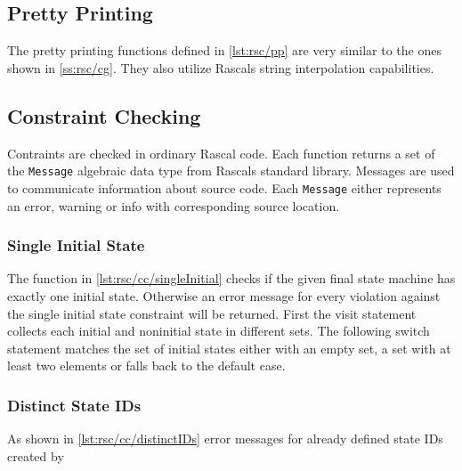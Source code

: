\subsection{Pretty Printing}

The pretty printing functions defined in \autoref{lst:rsc/pp} are very similar to the ones shown in \autoref{ss:rsc/cg}.
They also utilize Rascals string interpolation capabilities.



\subsection{Constraint Checking}

Contraints are checked in ordinary Rascal code.
Each function returns a set of the \lstinline{Message} algebraic data type from Rascals standard library.
Messages are used to communicate information about source code.
Each \lstinline{Message} either represents an error, warning or info with corresponding source location.

\subsubsection{Single Initial State}

The function in \autoref{lst:rsc/cc/singleInitial} checks if the given final state machine has exactly one initial state.
Otherwise an error message for every violation against the single initial state constraint will be returned.
First the visit statement collects each initial and noninitial state in different sets.
The following switch statement matches the set of initial states either with an empty set, a set with at least two elements or falls back to the default case.



\subsubsection{Distinct State IDs}

As shown in \autoref{lst:rsc/cc/distinctIDs} error messages for already defined state IDs created by

